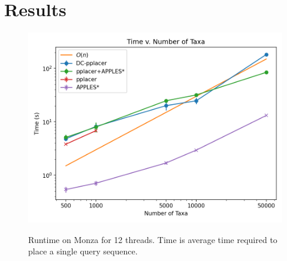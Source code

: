 \documentclass[10pt]{article}
\begin{document}
\section{Results}

\begin{figure}[h]
\centering
\includegraphics[width=\textwidth]{Figs/Vs-timing-results.png}
\label{fig:timing-results}
\caption{Runtime on Monza for 12 threads. Time is average time required to place a single query sequence.}
\end{figure}
\end{document}
